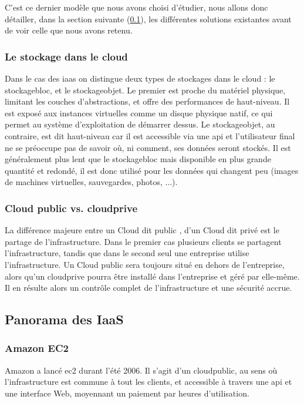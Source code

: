 \documentclass[a4paper,oneside]{report}
\begin{document}
C'est ce dernier modèle que nous avons choisi d'étudier, nous allons donc détailler, dans la section suivante (\ref{sec:panorama_iaas}), les différentes solutions existantes avant de voir celle que nous avons retenu.

\subsubsection{Le stockage dans le cloud}
Dans le cas des \gls{iaas} on distingue deux types de stockages dans le cloud : le \gls{stockagebloc}, et le \gls{stockageobjet}.
Le premier est proche du matériel physique, limitant les couches d'abstractions, et offre des performances de haut-niveau.
Il est exposé aux instances virtuelles comme un disque physique natif, ce qui permet au système d'exploitation de démarrer dessus.\newline
Le \gls{stockageobjet}, au contraire, est dit \og haut-niveau \fg car il est accessible via une \gls{api} et l'utilisateur final ne se préoccupe pas de savoir où, ni comment, ses données seront stockés.
Il est généralement plus lent que le \gls{stockagebloc} mais disponible en plus grande quantité et redondé, il est donc utilisé pour les données qui changent peu (images de machines virtuelles, sauvegardes, photos, ...).

\subsubsection{Cloud public vs. \gls{cloudprive}}
La différence majeure entre un Cloud dit \og public \fg, d'un Cloud dit \og privé \fg est le partage de l'infrastructure.
Dans le premier cas plusieurs clients se partagent l'infrastructure, tandis que dans le second seul une entreprise utilise l'infrastructure.\newline
Un Cloud public sera toujours situé en dehors de l'entreprise, alors qu'un \gls{cloudprive} pourra être installé dans l'entreprise et géré par elle-même.
Il en résulte alors un contrôle complet de l'infrastructure et une sécurité accrue.

\subsection{Panorama des IaaS} \label{sec:panorama_iaas}
\subsubsection{Amazon EC2}
Amazon a lancé \gls{ec2} durant l'été 2006.
Il s'agit d'un \gls{cloudpublic}, au sens où l'infrastructure est commune à tout les clients, et accessible à travers une \gls{api} et une interface Web, moyennant un paiement par heures d'utilisation.
\end{document}

